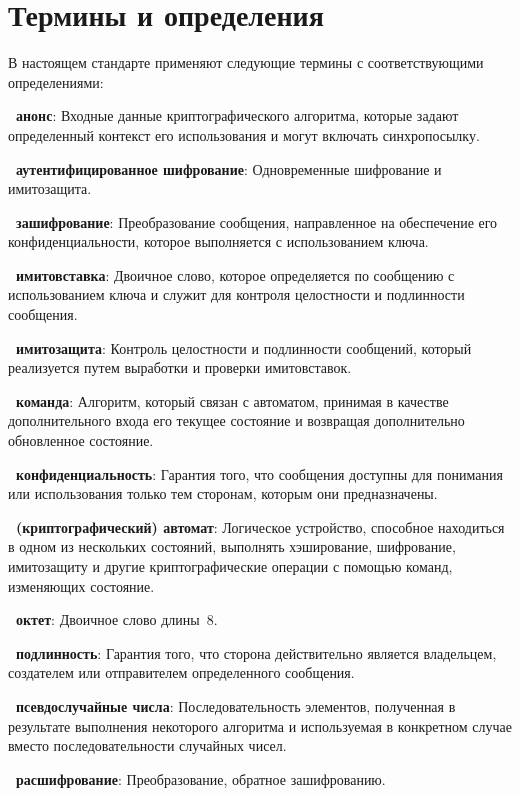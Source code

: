 \chapter{Термины и определения}

В настоящем стандарте применяют
следующие термины с соответствующими определениями:

{\bf \thedefctr~анонс}:
Входные данные криптографического алгоритма,
которые задают определенный контекст его использования
и могут включать синхропосылку.

{\bf \thedefctr~аутентифицированное шифрование}:
Одновременные шифрование и имитозащита.

{\bf \thedefctr~зашифрование}:
Преобразование сообщения,
направленное на обеспечение его конфиденциальности,
которое выполняется с использованием ключа.

{\bf \thedefctr~имитовставка}:
Двоичное слово, 
которое определяется по сообщению с использованием ключа 
и служит для контроля целостности и подлинности сообщения.

{\bf \thedefctr~имитозащита}:
Контроль целостности и подлинности сообщений, 
который реализуется путем выработки и проверки имитовставок.

{\bf \thedefctr~команда}:
Алгоритм, который связан с автоматом, принимая 
в качестве дополнительного входа его текущее состояние
и возвращая дополнительно обновленное состояние.

{\bf \thedefctr~конфиденциальность}:
Гарантия того, что сообщения доступны для понимания или использования
только тем сторонам, которым они предназначены.

{\bf \thedefctr~(криптографический) автомат}:
Логическое устройство, способное находиться в одном из нескольких 
состояний, выполнять хэширование, шифрование, имитозащиту и другие 
криптографические операции с помощью команд, изменяющих состояние.

{\bf \thedefctr~октет}:
Двоичное слово длины~$8$.

{\bf \thedefctr~подлинность}:
Гарантия того, что сторона действительно является владельцем, 
создателем или отправителем определенного сообщения.

{\bf \thedefctr~псевдослучайные числа}: 
Последовательность элементов, полученная в результате выполнения некоторого
алгоритма и используемая в конкретном случае вместо последовательности случайных
чисел.

{\bf \thedefctr~расшифрование}:
Преобразование, обратное зашифрованию.

